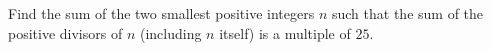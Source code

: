 Find the sum of the two smallest positive integers $n$ such that the sum of the positive divisors of $n$ (including $n$ itself) is a multiple of $25$.
